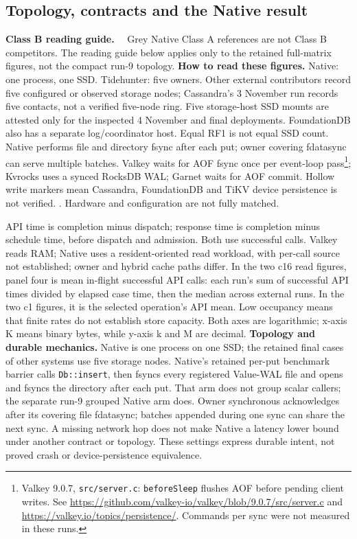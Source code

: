 \subsection{Topology, contracts and the Native result}\label{sec:native-gap}
\textbf{Class B reading guide.} \ackB\ \ackUnknown\ Grey Native Class A references are not Class B competitors. The reading guide below applies only to the retained full-matrix figures, not the compact run-9 topology.
\textbf{How to read these figures.} Native: one process, one SSD. Tidehunter: five owners. Other external contributors record five configured or observed storage nodes; Cassandra's 3 November run records five contacts, not a verified five-node ring. Five storage-host SSD mounts are attested only for the inspected 4 November and final deployments. FoundationDB also has a separate log/coordinator host. Equal RF1 is not equal SSD count. Native performs file and directory fsync after each put; owner covering fdatasync can serve multiple batches. Valkey waits for AOF fsync once per event-loop pass\footnote{Valkey 9.0.7, \texttt{src/server.c}: \texttt{beforeSleep} flushes AOF before pending client writes. See \url{https://github.com/valkey-io/valkey/blob/9.0.7/src/server.c} and \url{https://valkey.io/topics/persistence/}. Commands per sync were not measured in these runs.}; Kvrocks uses a synced RocksDB WAL; Garnet waits for AOF commit. Hollow write markers mean Cassandra, FoundationDB and TiKV device persistence is not verified. \runs. Hardware and configuration are not fully matched.

API time is completion minus dispatch; response time is completion minus schedule time, before dispatch and admission. Both use successful calls. Valkey reads RAM; Native uses a resident-oriented read workload, with per-call source not established; owner and hybrid cache paths differ. In the two c16 read figures, panel four is mean in-flight successful API calls: each run's sum of successful API times divided by elapsed case time, then the median across external runs. In the two c1 figures, it is the selected operation's API mean. Low occupancy means that finite rates do not establish store capacity. Both axes are logarithmic; x-axis K means binary bytes, while y-axis k and M are decimal.
\textbf{Topology and durable mechanics.} Native is one process on one SSD; the retained final cases of other systems use five storage nodes. Native's retained per-put benchmark barrier calls \texttt{Db::insert}, then fsyncs every registered Value-WAL file and opens and fsyncs the directory after each put. That arm does not group scalar callers; the separate run-9 grouped Native arm does. Owner synchronous acknowledges after its covering file fdatasync; batches appended during one sync can share the next sync. A missing network hop does not make Native a latency lower bound under another contract or topology. These settings express durable intent, not proved crash or device-persistence equivalence.

